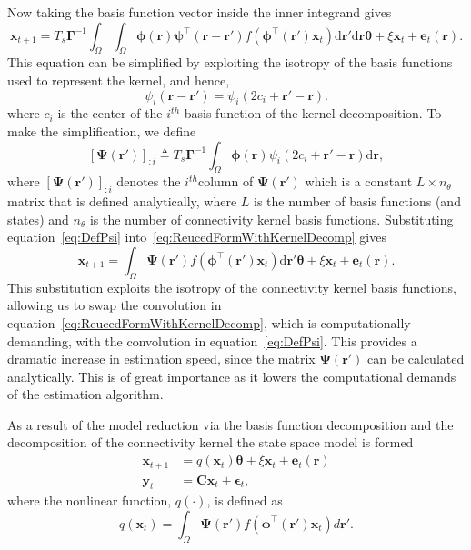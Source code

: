 \documentclass[]{article}
\begin{document}
Now taking the basis function vector inside the inner integrand gives
\begin{equation}\label{eq:ReucedFormWithKernelDecomp}
	 \mathbf{x}_{t+1} = T_s\boldsymbol{\Gamma}^{-1}
	 \int_\Omega \int_\Omega \boldsymbol{\phi}(\mathbf{r})\boldsymbol{\psi}^{\top} (\mathbf{r}-\mathbf{r}')f(\boldsymbol{\phi}^{\top}(\mathbf{r}')\mathbf{x}_t) \textrm{d}\mathbf{r}' \textrm{d}\mathbf{r} \boldsymbol{\theta}  
	 + \xi\mathbf{x}_t + \mathbf{e}_t(\mathbf{r}).
\end{equation}
This equation can be simplified by exploiting the isotropy of the basis functions used to represent the kernel, and hence,
\begin{equation}
	\psi_i (\mathbf{r}-\mathbf{r}') = \psi_i (2c_i+\mathbf{r}'-\mathbf{r}).
\end{equation}
where $c_i$ is the center of the $i^{th}$ basis function of the kernel decomposition. To make the simplification, we define
\begin{equation}\label{eq:DefPsi}
	\left[ \boldsymbol\Psi(\mathbf{r}')\right]_{:i}  \triangleq T_s\boldsymbol{\Gamma}^{-1}\int_\Omega {\boldsymbol{\phi}(\mathbf{r})\psi_i (2c_i+\mathbf{r}'-\mathbf{r})\textrm{d}\mathbf{r}},
\end{equation}
where $\left[ \boldsymbol\Psi(\mathbf{r}')\right]_{:i}$ denotes the $i^{th}$column of $\boldsymbol{\Psi}(\mathbf{r}')$ which is a constant $L \times n_{\theta}$ matrix that is defined analytically, where $L$ is the number of basis functions (and states) and $n_{\theta}$ is the number of connectivity kernel basis functions. Substituting equation~\ref{eq:DefPsi} into~\ref{eq:ReucedFormWithKernelDecomp} gives
\begin{equation}
	\mathbf{x}_{t+1} = \int_\Omega \boldsymbol{\Psi}(\mathbf{r}') f(\boldsymbol{\phi}^{\top}(\mathbf{r}')\mathbf{x}_t) \textrm{d}\mathbf{r}' \boldsymbol{\theta} + \xi\mathbf{x}_t 
+ \mathbf{e}_t(\mathbf{r}).
\end{equation}
This substitution exploits the isotropy of the connectivity kernel basis functions, allowing us to swap the convolution in equation~\ref{eq:ReucedFormWithKernelDecomp}, which is computationally demanding, with the convolution in equation~\ref{eq:DefPsi}. This provides a dramatic increase in estimation speed, since the matrix $\boldsymbol\Psi(\mathbf{r}')$ can be calculated analytically. This is of great importance as it lowers the computational demands of the estimation algorithm.

As a result of the model reduction via the basis function decomposition and the decomposition of the connectivity kernel the state space model is formed
\begin{align}
 \mathbf x_{t+1}&=q(\mathbf x_t)\boldsymbol\theta+\xi \mathbf x_t+\boldsymbol e_t(\mathbf r) \label{eq:StateEq} \\
 \mathbf y_t&=\mathbf C \mathbf x_t+\boldsymbol \epsilon_t,\label{eq:OutputEq}
\end{align}
where the nonlinear function, $q(\cdot)$, is defined as
\begin{equation}\label{eq:QmatrixForSigmapoints}
	q(\mathbf{x}_t) = \int_\Omega \boldsymbol{\Psi}(\mathbf{r}') f(\boldsymbol{\phi}^{\top}(\mathbf{r}')\mathbf{x}_t) d\mathbf{r}'.
\end{equation}
\end{document}
